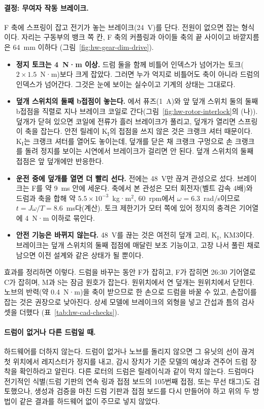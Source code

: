 \paragraph{결정: 무여자 작동 브레이크.} F 축에 스프링이 잡고 전기가 놓는 브레이크(24~V)를 단다. 전원이 없으면 잡는
형식이다. 자리는 구동부의 뱅크 쪽 칸, F 축의 커플링과 아이들 축의 끝 사이이고 바깥지름은 64~mm 이하다
(그림~\ref{fig:hw-gear-dim-drive}).
\begin{itemize}
\item \textbf{정지 토크는 4~N·m 이상.} 드럼 둘을 함께 비틀어 인덱스가 넘어가는 토크($2 \times 1.5$~N·m)보다 크게
잡았다. 그러면 누가 억지로 비틀어도 축이 아니라 드럼의 인덱스가 넘어간다. 그것은 눈에 보이는 실수이고 기계의 상태는
그대로다.
\item \textbf{덮개 스위치의 둘째 b접점이 놓는다.} 에서 퓨즈(1~A)와 앞 덮개 스위치 둘의 둘째 b접점을
직렬로 지나 브레이크 코일로 간다(그림~\ref{fig:hw-rotor-interlock}의 (나)). 덮개가 닫혀 있으면 코일에 전류가 흘러
브레이크가 풀리고, 덮개가 열리면 스프링이 축을 잡는다. 안전 릴레이 K$_\mathrm{I}$의 접점을 쓰지 않은 것은 크랭크
셔터 때문이다. K$_\mathrm{I}$는 크랭크 셔터를 열어도 놓이는데, 덮개를 닫은 채 크랭크 구멍으로 손 크랭크를 돌려
정지를 보이는 시연에서 브레이크가 걸리면 안 된다. 덮개 스위치의 둘째 접점은 앞 덮개에만 반응한다.
\item \textbf{운전 중에 덮개를 열면 더 빨리 선다.} 전에는 48~V만 끊겨 관성으로 섰다. 브레이크는 F를 약 9~ms 안에 세운다.
축에서 본 관성은 모터 회전자(벨트 감속 4배)와 드럼과 축을 합해 약 $5.5 \times 10^{-3}$~kg·m$^2$, 60~rpm에서
$\omega = 6.3$~rad/s이므로 $t = J\omega/T = 8.6$~ms다(계산). 토크 제한기가 모터 쪽에 있어 정지의 충격은 기어열에
4~N·m 이하로 묶인다.
\item \textbf{안전 기능은 바뀌지 않는다.} 48~V를 끊는 것은 여전히 덮개 고리, K$_\mathrm{I}$, KM3이다. 브레이크는 덮개
스위치의 둘째 접점에 매달린 보조 기능이고, 고장 나서 풀린 채로 남으면 이전 설계와 같은 상태가 될 뿐이다.
\end{itemize}
효과를 정리하면 이렇다. 드럼을 바꾸는 동안 F가 잡히고, F가 잡히면 26:30 기어열로 C가 잡히며, M과 S는 잠금 원호가
잡는다. 원위치에서 연 덮개는 원위치에서 닫힌다. 노브의 반력(약 0.4~N·m)을 축이 받으므로 한 손으로 드럼을 바꿀 수
있고, 손잡이를 잡는 것은 권장으로 낮아진다. 상세 모델에 브레이크의 외형을 넣고 간섭과 틈의 검사 셋을 더했다
(표~\ref{tab:hw-cad-checks}).

\paragraph{드럼이 없거나 다른 드럼일 때.} 하드웨어를 더하지 않는다. 드럼이 없거나 노브를 돌리지 않으면 그 유닛의 선이
끊겨 첫 위치에서 레지스터가 정지를 내고, 감시 장치가 기준 모델의 예상과 견주어 드럼 장착을 확인하라고 알린다. 다른
로터의 드럼은 릴레이식과 같이 막지 않는다. 드럼마다 전기적인 식별(드럼 기판의 연속 링과 접점 보드의 105번째 접점,
또는 무선 태그)도 검토했으나, 생성과 검증을 마친 드럼 기판과 접점 보드를 다시 만들어야 하고 위의 두 방법이 같은
결과를 하드웨어 없이 주므로 넣지 않았다.

